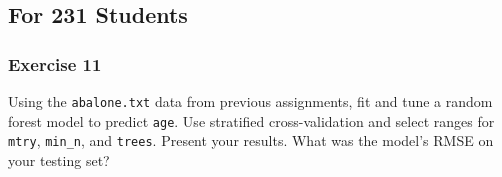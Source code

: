 \documentclass[
]{article}
\begin{document}
\hypertarget{for-231-students}{%
\subsection{For 231 Students}\label{for-231-students}}

\hypertarget{exercise-11}{%
\subsubsection{Exercise 11}\label{exercise-11}}

Using the \texttt{abalone.txt} data from previous assignments, fit and
tune a random forest model to predict \texttt{age}. Use stratified
cross-validation and select ranges for \texttt{mtry}, \texttt{min\_n},
and \texttt{trees}. Present your results. What was the model's RMSE on
your testing set?
\end{document}

